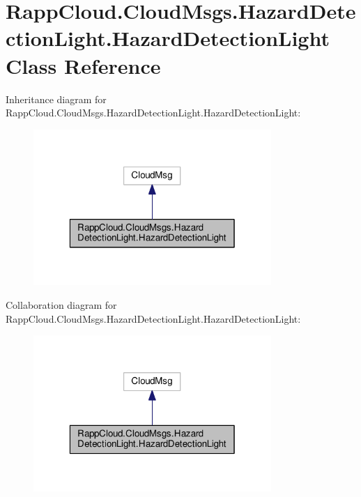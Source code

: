 \hypertarget{classRappCloud_1_1CloudMsgs_1_1HazardDetectionLight_1_1HazardDetectionLight}{\section{Rapp\-Cloud.\-Cloud\-Msgs.\-Hazard\-Detection\-Light.\-Hazard\-Detection\-Light Class Reference}
\label{classRappCloud_1_1CloudMsgs_1_1HazardDetectionLight_1_1HazardDetectionLight}
}


Inheritance diagram for Rapp\-Cloud.\-Cloud\-Msgs.\-Hazard\-Detection\-Light.\-Hazard\-Detection\-Light\-:
\nopagebreak
\begin{figure}[H]
\begin{center}
\leavevmode
\includegraphics[width=256pt]{classRappCloud_1_1CloudMsgs_1_1HazardDetectionLight_1_1HazardDetectionLight__inherit__graph}
\end{center}
\end{figure}


Collaboration diagram for Rapp\-Cloud.\-Cloud\-Msgs.\-Hazard\-Detection\-Light.\-Hazard\-Detection\-Light\-:
\nopagebreak
\begin{figure}[H]
\begin{center}
\leavevmode
\includegraphics[width=256pt]{classRappCloud_1_1CloudMsgs_1_1HazardDetectionLight_1_1HazardDetectionLight__coll__graph}
\end{center}
\end{figure}
